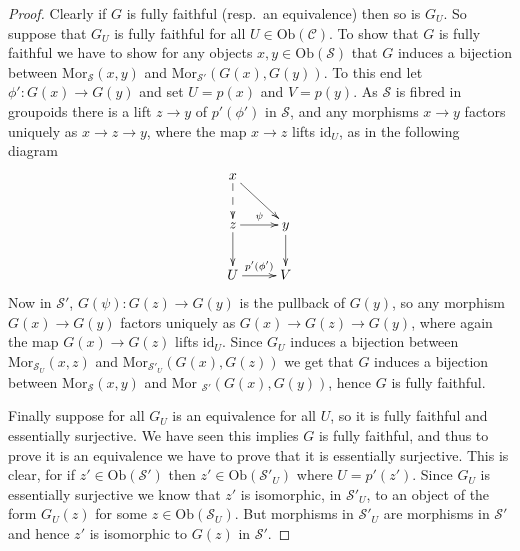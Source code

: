 \begin{proof}
Clearly if $G$ is fully faithful (resp.\ an equivalence) then so is $G_U$. So
suppose that $G_U$ is fully faithful for all $U\in\text{Ob}(\mathcal C)$. To
show that $G$ is fully faithful we have to show for any objects
$x,y\in\text{Ob}(\mathcal{S})$ that $G$ induces a bijection between
$\text{Mor}_{\mathcal{S}}(x,y)$ and $\text{Mor}_{\mathcal{S}'}(G(x),G(y))$. 
To this end let $\phi'\colon G(x)\to G(y)$ and set $U=p(x)$ and $V=p(y)$.
As $\mathcal{S}$ is fibred in groupoids there is a lift $z\to y$ of 
$p'(\phi')$ in $\mathcal{S}$, and any morphisms $x\to y$ factors uniquely
as $x\to z\to y$, where the map $x\to z$ lifts $\text{id}_U$, as in the
following diagram
$$
\xymatrix{
x \ar@{-->}[d] \ar[rd]  \\
z \ar[r]^\psi \ar[d] & y \ar[d] \\
U \ar[r]^{p'(\phi')} &V}
$$ 
Now in $\mathcal{S}'$,  $G(\psi)\colon G(z)\to G(y)$ is the pullback of
$G(y)$, so any morphism $G(x)\to G(y)$ factors uniquely
as $G(x)\to G(z)\to G(y)$, where again the map
$G(x)\to G(z)$ lifts $\text{id}_U$.  Since $G_U$
induces a bijection between $\text{Mor}_{\mathcal{S}_U}(x,z)$ and
$\text{Mor}_{\mathcal{S}'_U}(G(x),G(z))$ we get that
$G$ induces a bijection between $\text{Mor}_{\mathcal{S}}(x,y)$
and $\text{Mor }_{\mathcal{S}'}(G(x),G(y))$, hence $G$
is fully faithful.

\smallskip\noindent
Finally suppose for all $G_U$ is an equivalence for all $U$, so it is
fully faithful and essentially surjective.  We have seen this implies $G$ is
fully faithful, and thus to prove it is an equivalence we have to prove that
it is essentially surjective.  This is clear, for if $z'\in
\text{Ob}(\mathcal{S}')$ then $z'\in \text{Ob}(\mathcal{S}'_U)$ where
$U=p'(z')$.  Since $G_U$ is essentially surjective we know that
$z'$ is isomorphic, in $\mathcal{S}'_U$, to an object of the form
$G_U(z)$ for some $z\in \text{Ob}(\mathcal{S}_U)$.  But morphisms
in $\mathcal{S}'_U$ are morphisms in $\mathcal{S}'$ and hence $z'$ is
isomorphic to $G(z)$ in $\mathcal{S}'$.
\end{proof}

